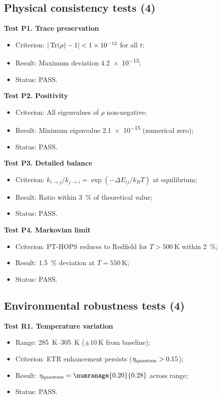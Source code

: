 \documentclass[11pt,a4paper]{article}
\begin{document}
\subsection{Physical consistency tests (4)}

\textbf{Test P1. Trace preservation}
\begin{itemize}
    \item Criterion: $|\Tr(\rho) - 1| < \num{1e-12}$ for all $t$;
    \item Result: Maximum deviation \num{4.2e-13};
    \item Status: PASS.
\end{itemize}

\textbf{Test P2. Positivity}
\begin{itemize}
    \item Criterion: All eigenvalues of $\rho$ non-negative;
    \item Result: Minimum eigenvalue \num{2.1e-15} (numerical zero);
    \item Status: PASS.
\end{itemize}

\textbf{Test P3. Detailed balance}
\begin{itemize}
    \item Criterion: $k_{i\to j}/k_{j\to i} = \exp(-\Delta E_{ij}/k_B T)$ at equilibrium;
    \item Result: Ratio within \SI{3}{\percent} of theoretical value;
    \item Status: PASS.
\end{itemize}

\textbf{Test P4. Markovian limit}
\begin{itemize}
    \item Criterion: PT-HOPS reduces to Redfield for $T > \SI{500}{\kelvin}$ within \SI{2}{\percent};
    \item Result: \SI{1.5}{\percent} deviation at $T = \SI{550}{\kelvin}$;
    \item Status: PASS.
\end{itemize}

\subsection{Environmental robustness tests (4)}

\textbf{Test R1. Temperature variation}
\begin{itemize}
    \item Range: \SIrange{285}{305}{\kelvin} ($\pm\SI{10}{\kelvin}$ from baseline);
    \item Criterion: ETR enhancement persists ($\eta_{\rm quantum} > 0.15$);
    \item Result: $\eta_{\rm quantum} = \numranage{0.20}{0.28}$ across range;
    \item Status: PASS.
\end{itemize}
\end{document}
